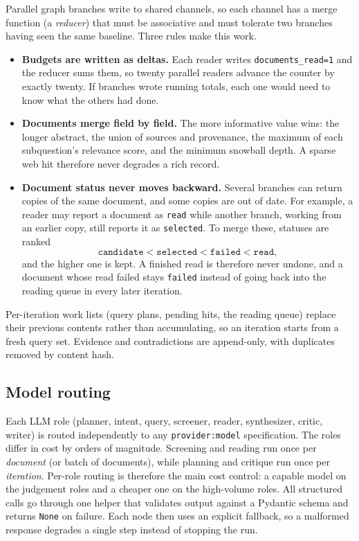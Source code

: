 \documentclass[10pt,a4paper]{article}
\newcommand{\hfont}{\sffamily}
\renewcommand{\paragraph}[1]{%
  \par\vspace{0.35em}{\hfont\bfseries\color{accent}#1}\hspace{0.6em}\ignorespaces}
\newcommand{\code}[1]{\texttt{#1}}
\begin{document}
\paragraph{Reducers under fan-out.}
Parallel graph branches write to shared channels, so each channel has a
merge function (a \emph{reducer}) that must be associative and must
tolerate two branches having seen the same baseline. Three rules make this
work.

\begin{itemize}[leftmargin=*]
  \item \textbf{Budgets are written as deltas.} Each reader writes
    \code{documents\_read=1} and the reducer sums them, so twenty parallel
    readers advance the counter by exactly twenty. If branches wrote
    running totals, each one would need to know what the others had done.
  \item \textbf{Documents merge field by field.} The more informative value
    wins: the longer abstract, the union of sources and provenance, the
    maximum of each subquestion's relevance score, and the minimum
    snowball depth. A sparse web hit therefore never degrades a rich
    record.
  \item \textbf{Document status never moves backward.} Several branches
    can return copies of the same document, and some copies are out of
    date. For example, a reader may report a document as \code{read}
    while another branch, working from an earlier copy, still reports it
    as \code{selected}. To merge these, statuses are ranked
    \[
      \texttt{candidate} < \texttt{selected}
      < \texttt{failed} < \texttt{read},
    \]
    and the higher one is kept. A finished read is therefore never
    undone, and a document whose read failed stays \code{failed} instead
    of going back into the reading queue in every later iteration.
\end{itemize}

Per-iteration work lists (query plans, pending hits, the reading queue)
replace their previous contents rather than accumulating, so an iteration
starts from a fresh query set. Evidence and contradictions are append-only,
with duplicates removed by content hash.

\subsection{Model routing}

Each LLM role (planner, intent, query, screener, reader, synthesizer,
critic, writer) is routed independently to any \code{provider:model}
specification. The roles differ in cost by orders of magnitude. Screening
and reading run once per \emph{document} (or batch of documents), while planning
and critique run once per \emph{iteration}. Per-role routing is therefore
the main cost control: a capable model on the judgement roles and a cheaper
one on the high-volume roles. All structured calls go through one helper
that validates output against a Pydantic schema and returns \code{None} on
failure. Each node then uses an explicit fallback, so a malformed response
degrades a single step instead of stopping the run.
\end{document}
